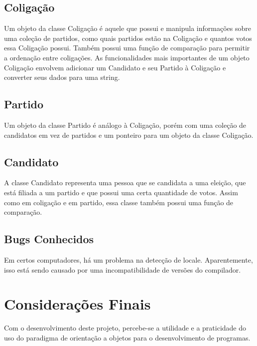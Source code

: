 \documentclass[oneside]{abntex2}
\begin{document}
	\section{Coligação}
Um objeto da classe Coligação é aquele que possui e manipula informações sobre uma coleção de partidos, como quais partidos estão na Coligação e quantos votos essa Coligação possui. Também possui uma função de comparação para permitir a ordenação entre coligações. As funcionalidades mais importantes de um objeto Coligação envolvem adicionar um Candidato e seu Partido à Coligação e converter seus dados para uma string.

	\section{Partido}
Um objeto da classe Partido é análogo à Coligação, porém com uma coleção de candidatos em vez de partidos e um ponteiro para um objeto da classe Coligação.

	\section{Candidato}
A classe Candidato representa uma pessoa que se candidata a uma eleição, que está filiada a um partido e que possui uma certa quantidade de votos. Assim como em coligação e em partido, essa classe também possui uma função de comparação.

	\section{Bugs Conhecidos}
Em certos computadores, há um problema na detecção de locale. Aparentemente, isso está sendo causado por uma incompatibilidade de versões do compilador.

    \newpage
    \chapter{Considerações Finais}
Com o desenvolvimento deste projeto, percebe-se a utilidade e a praticidade do uso do paradigma de orientação a objetos para o desenvolvimento de programas.
\end{document}
